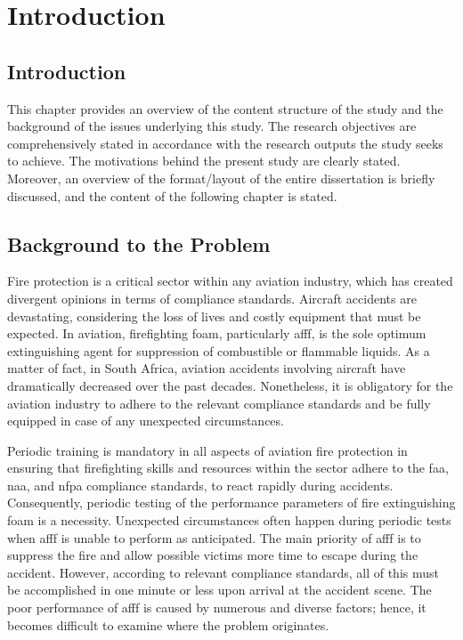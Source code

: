 \chapter{Introduction}
\section{Introduction}
This chapter provides an overview of the content structure of the study and the background of the issues underlying this study. The research objectives are comprehensively stated in accordance with the research outputs the study seeks to achieve. The motivations behind the present study are clearly stated. Moreover, an overview of the format/layout of the entire dissertation is briefly discussed, and the content of the following chapter is stated.

\section{Background to the Problem}
Fire protection is a critical sector within any aviation industry, which has created divergent opinions in terms of compliance standards. Aircraft accidents are devastating, considering the loss of lives and costly equipment that must be expected. In aviation, firefighting foam, particularly \acrfull{afff}, is the sole optimum extinguishing agent for suppression of combustible or flammable liquids. As a matter of fact, in South Africa, aviation accidents involving aircraft have dramatically decreased over the past decades. Nonetheless, it is obligatory for the aviation industry to adhere to the relevant compliance standards and be fully equipped in case of any unexpected circumstances.

Periodic training is mandatory in all aspects of aviation fire protection in ensuring that firefighting skills and resources within the sector adhere to the \acrfull{faa}, \acrfull{naa}, and \Acrfull{nfpa} compliance standards, to react rapidly during accidents. Consequently, periodic testing of the performance parameters of fire extinguishing foam is a necessity. Unexpected circumstances often happen during periodic tests when \acrshort{afff} is unable to perform as anticipated. The main priority of \acrshort{afff} is to suppress the fire and allow possible victims more time to escape during the accident. However, according to relevant compliance standards, all of this must be accomplished in one minute or less upon arrival at the accident scene. The poor performance of \acrshort{afff} is caused by numerous and diverse factors; hence, it becomes difficult to examine where the problem originates.

